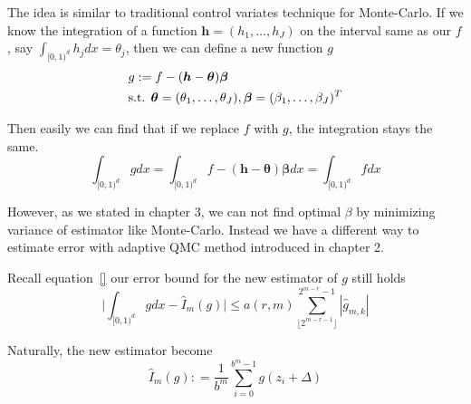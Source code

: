 


The idea is similar to traditional control variates technique for Monte-Carlo.
If we know the integration of a function $\boldsymbol{h}=(h_1,\dots,h_J)$ on the interval same as our $f$, say $\int_{[0,1)^d}h_jdx=\theta_j$, then we can define a new function $g$
\begin{align}\label{eq:defg}
    & g:=f-(\boldsymbol{h}-\boldsymbol{\theta})\boldsymbol{\beta}\\
    \notag
    &\text{s.t. }\boldsymbol{\theta}=(\theta_1,\dots,\theta_J),
    \boldsymbol{\beta}=(\beta_1,\dots,\beta_J)^T
\end{align}

Then easily we can find that if we replace $f$ with $g$, the integration stays the same.
\[
	\int_{[0,1)^d}gdx
        =\int_{[0,1)^d}f-(\boldsymbol{h}-\boldsymbol{\theta})\boldsymbol{\beta}dx
			=\int_{[0,1)^d}fdx
\]

However, as we stated in chapter 3, we can not find optimal $\beta$ by minimizing variance of estimator like Monte-Carlo. Instead we have a different way to estimate error with adaptive QMC method introduced in chapter 2.

Recall equation~\eqref{} our error bound for the new estimator of $g$ still holds
\begin{equation}\label{eq:qmccvErr}
	\Big|\int_{[0,1)^d}gdx - \hat{I}_m(g)\Big| \leq a(r,m) \sum_{\lfloor 2^{m-r-1} \rfloor}^{2^{m-r}-1} |\hat{g}_{m,k}|
\end{equation}

Naturally, the new estimator become
\begin{equation}\label{eq:estcv}
    \hat{I}_m({g}): = \frac{1}{b^m}\sum_{i=0}^{b^m-1}g(z_i+\Delta)
\end{equation}


